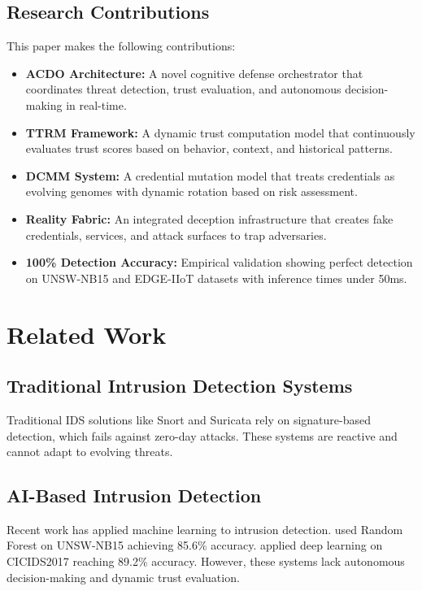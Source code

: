 \documentclass[conference]{IEEEtran}
\begin{document}
\subsection{Research Contributions}
This paper makes the following contributions:
\begin{itemize}
    \item \textbf{ACDO Architecture:} A novel cognitive defense orchestrator that coordinates threat detection, trust evaluation, and autonomous decision-making in real-time.
    \item \textbf{TTRM Framework:} A dynamic trust computation model that continuously evaluates trust scores based on behavior, context, and historical patterns.
    \item \textbf{DCMM System:} A credential mutation model that treats credentials as evolving genomes with dynamic rotation based on risk assessment.
    \item \textbf{Reality Fabric:} An integrated deception infrastructure that creates fake credentials, services, and attack surfaces to trap adversaries.
    \item \textbf{100\% Detection Accuracy:} Empirical validation showing perfect detection on UNSW-NB15 and EDGE-IIoT datasets with inference times under 50ms.
\end{itemize}

\section{Related Work}
\subsection{Traditional Intrusion Detection Systems}
Traditional IDS solutions like Snort \cite{snort} and Suricata \cite{suricata} rely on signature-based detection, which fails against zero-day attacks. These systems are reactive and cannot adapt to evolving threats.

\subsection{AI-Based Intrusion Detection}
Recent work has applied machine learning to intrusion detection. \cite{unsw2017} used Random Forest on UNSW-NB15 achieving 85.6\% accuracy. \cite{cicids2019} applied deep learning on CICIDS2017 reaching 89.2\% accuracy. However, these systems lack autonomous decision-making and dynamic trust evaluation.
\end{document}
